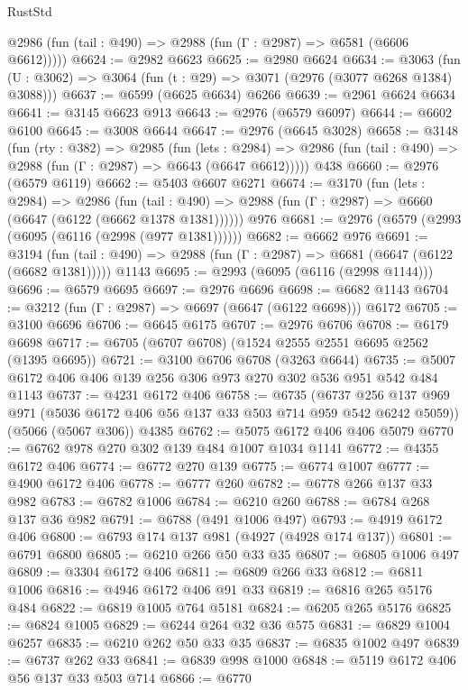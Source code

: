 \begin{lexlean}{RustStd}
\begin{coremodule}
      @2986 (fun (tail : @490) => @2988 (fun (Γ : @2987) => @6581 (@6606 @6612)))))
@6624 := @2982 @6623
@6625 := @2980 @6624
@6634 := @3063 (fun (U : @3062) => @3064 (fun (t : @29) => @3071 (@2976 (@3077 @6268 @1384) @3088)))
@6637 := @6599 (@6625 @6634) @6266
@6639 := @2961 @6624 @6634
@6641 := @3145 @6623 @913
@6643 := @2976 (@6579 @6097)
@6644 := @6602 @6100
@6645 := @3008 @6644
@6647 := @2976 (@6645 @3028)
@6658 := @3148
    (fun (rty : @382) =>
    @2985
      (fun (lets : @2984) =>
      @2986 (fun (tail : @490) => @2988 (fun (Γ : @2987) => @6643 (@6647 @6612)))))
    @438
@6660 := @2976 (@6579 @6119)
@6662 := @5403 @6607 @6271
@6674 := @3170
    (fun (lets : @2984) =>
    @2986
      (fun (tail : @490) => @2988 (fun (Γ : @2987) => @6660 (@6647 (@6122 (@6662 @1378 @1381))))))
    @976
@6681 := @2976 (@6579 (@2993 (@6095 (@6116 (@2998 (@977 @1381))))))
@6682 := @6662 @976
@6691 := @3194
    (fun (tail : @490) => @2988 (fun (Γ : @2987) => @6681 (@6647 (@6122 (@6682 @1381)))))
    @1143
@6695 := @2993 (@6095 (@6116 (@2998 @1144)))
@6696 := @6579 @6695
@6697 := @2976 @6696
@6698 := @6682 @1143
@6704 := @3212 (fun (Γ : @2987) => @6697 (@6647 (@6122 @6698))) @6172
@6705 := @3100 @6696
@6706 := @6645 @6175
@6707 := @2976 @6706
@6708 := @6179 @6698
@6717 := @6705 (@6707 @6708) (@1524 @2555 @2551 @6695 @2562 (@1395 @6695))
@6721 := @3100 @6706 @6708 (@3263 @6644)
@6735 := @5007 @6172 @406 @406 @139 @256 @306 @973 @270 @302 @536 @951 @542 @484 @1143
@6737 := @4231 @6172 @406
@6758 := @6735
    (@6737 @256 @137 @969 @971 (@5036 @6172 @406 @56 @137 @33 @503 @714 @959 @542 @6242 @5059))
    (@5066 (@5067 @306))
    @4385
@6762 := @5075 @6172 @406 @406 @5079
@6770 := @6762 @978 @270 @302 @139 @484 @1007 @1034 @1141
@6772 := @4355 @6172 @406
@6774 := @6772 @270 @139
@6775 := @6774 @1007
@6777 := @4900 @6172 @406
@6778 := @6777 @260
@6782 := @6778 @266 @137 @33 @982
@6783 := @6782 @1006
@6784 := @6210 @260
@6788 := @6784 @268 @137 @36 @982
@6791 := @6788 (@491 @1006 @497)
@6793 := @4919 @6172 @406
@6800 := @6793 @174 @137 @981 (@4927 (@4928 @174 @137))
@6801 := @6791 @6800
@6805 := @6210 @266 @50 @33 @35
@6807 := @6805 @1006 @497
@6809 := @3304 @6172 @406
@6811 := @6809 @266 @33
@6812 := @6811 @1006
@6816 := @4946 @6172 @406 @91 @33
@6819 := @6816 @265 @5176 @484
@6822 := @6819 @1005 @764 @5181
@6824 := @6205 @265 @5176
@6825 := @6824 @1005
@6829 := @6244 @264 @32 @36 @575
@6831 := @6829 @1004 @6257
@6835 := @6210 @262 @50 @33 @35
@6837 := @6835 @1002 @497
@6839 := @6737 @262 @33
@6841 := @6839 @998 @1000
@6848 := @5119 @6172 @406 @56 @137 @33 @503 @714
@6866 := @6770

\end{coremodule}
\end{lexlean}
